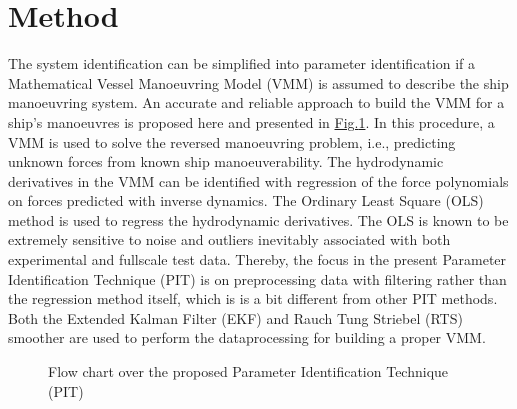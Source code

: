 \documentclass[review]{elsarticle}
\let\sphinxpxdimen\pdfpxdimen\else\newdimen\sphinxpxdimen
\begin{document}
\section{Method}
\label{\detokenize{01.01_method:method}}\label{\detokenize{01.01_method:id1}}\label{\detokenize{01.01_method::doc}}
\sphinxAtStartPar
The system identification can be simplified into parameter identification if a Mathematical Vessel Manoeuvring Model (VMM) is assumed to describe the ship manoeuvring system. An accurate and reliable approach to build the VMM for a ship’s manoeuvres is proposed here and presented in \hyperref[\detokenize{01.01_method:overview}]{Fig.\@ \ref{\detokenize{01.01_method:overview}}}.
In this procedure, a VMM is used to solve the reversed manoeuvring problem, i.e., predicting unknown forces from known ship manoeuverability. The hydrodynamic derivatives in the VMM can be identified with regression of the force polynomials on forces predicted with inverse dynamics. The Ordinary Least Square (OLS) method is used to regress the hydrodynamic derivatives. The OLS is known to be extremely sensitive to noise and outliers inevitably associated with both experimental and full\sphinxhyphen{}scale test data. Thereby, the focus in the present Parameter Identification Technique (PIT) is on pre\sphinxhyphen{}processing data with filtering rather than the regression method itself, which is is a bit different from other PIT methods. Both the Extended Kalman Filter (EKF) and Rauch Tung Striebel (RTS) smoother are used to perform the data\sphinxhyphen{}processing for building a proper VMM.

\begin{figure}[H]
\centering
\capstart

\noindent\sphinxincludegraphics[width=500\sphinxpxdimen]{{method}.png}
\caption{Flow chart over the proposed Parameter Identification Technique (PIT)}\label{\detokenize{01.01_method:overview}}\end{figure}
\end{document}
